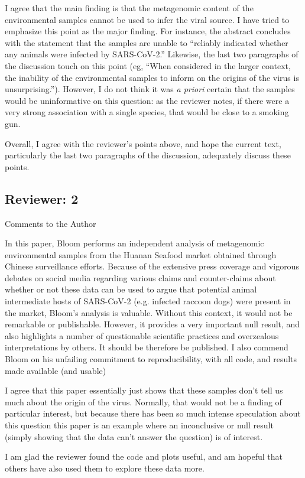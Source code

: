 \documentclass[11pt, oneside]{article}   	%
\newcommand{\response}[1]{{\color{black}#1}}
\begin{document}
\response{
I agree that the main finding is that the metagenomic content of the environmental samples cannot be used to infer the viral source.
I have tried to emphasize this point as the major finding.
For instance, the abstract concludes with the statement that the samples are unable to ``reliably indicated whether any animals were infected by SARS-CoV-2.''
Likewise, the last two paragraphs of the discussion touch on this point (eg, ``When considered in the larger context, the inability of the environmental samples to inform on the origins of the virus is unsurprising.'').
However, I do not think it was \textit{a priori} certain that the samples would be uninformative on this question: as the reviewer notes, if there were a very strong association with a single species, that would be close to a smoking gun.

Overall, I agree with the reviewer's points above, and hope the current text, particularly the last two paragraphs of the discussion, adequately discuss these points.
}

\subsection*{Reviewer: 2}

Comments to the Author

In this paper, Bloom performs an independent analysis of metagenomic environmental samples from the Huanan Seafood market obtained through Chinese surveillance efforts. Because of the extensive press coverage and vigorous debates on social media regarding various claims and counter-claims about whether or not these data can be used to argue that potential animal intermediate hosts of SARS-CoV-2 (e.g. infected raccoon dogs) were present in the market, Bloom's analysis is valuable. Without this context, it would not be remarkable or publishable. However, it provides a very important null result, and also highlights a number of questionable scientific practices and overzealous interpretations by others. It should be therefore be published. I also commend Bloom on his unfailing commitment to reproducibility, with all code, and results made available (and usable)

\response{
I agree that this paper essentially just shows that these samples don't tell us much about the origin of the virus.
Normally, that would not be a finding of particular interest, but because there has been so much intense speculation about this question this paper is an example where an inconclusive or null result (simply showing that the data can't answer the question) is of interest.

I am glad the reviewer found the code and plots useful, and am hopeful that others have also used them to explore these data more.
}
\end{document}
